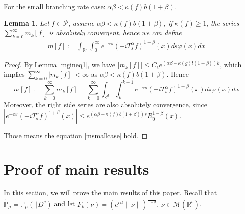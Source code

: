 \documentclass[12pt,oneside,english]{amsart}
\theoremstyle{plain}
\newtheorem{lem}[thm]{Lemma}
\theoremstyle{definition}
\numberwithin{equation}{section}
\begin{document}
For the small branching rate case: $\alpha\beta<\kappa(f)b(1+\beta)$.
\begin{lem}\label{lemma211}
Let $f\in \mathcal{P}$, assume $\alpha\beta<\kappa(f)b(1+\beta)$, if $\kappa(f)\geq 1$, the series $\sum_{k=0}^{\infty}m_k[f]$ is absolutely convergent, hence we can define
\begin{align}
    m[f]:=\int_{\mathbb{R}^d}\int_0^{\infty} e^{-\alpha s}(-iT_{s}^{\alpha}f)^{1+\beta}(x)ds\varphi(x)dx \label{msmallcase}
\end{align}
\end{lem}
\begin{proof}
    By Lemma \ref{mgineq1}, we have $|m_k[f]|\leq C_6 e^{(\alpha\beta-\kappa(g)b(1+\beta))k}$, which implies $\sum_{k=0}^{\infty}|m_k[f]|<\infty$ as $\alpha\beta<\kappa(f)b(1+\beta)$. Hence
    $$m[f]:=\sum_{k=0}^{\infty}m_k[f]=\sum_{k=0}^{\infty}\int_{\mathbb{R}^d}\int_k^{k+1} e^{-\alpha s}(-iT_{s}^{\alpha}f)^{1+\beta}(x)ds\varphi(x)dx$$
     Moreover, the right side series are also absolutely convergence, since $|e^{-\alpha s}(-iT_{s}^{\alpha}f)^{1+\beta}(x)|\leq e^{(\alpha\beta-\kappa(f)b(1+\beta))s}R_0^{1+\beta}(x)$.

     Those means the equation \eqref{msmallcase} hold.
\end{proof}

\section{Proof of main results}

In this section, we will prove the main results of this paper. Recall that $\mathbb{\tilde{P}}_{\mu}=\mathbb{P}_{\mu}(\cdot|D^c)$ and let $F_k(\nu)=\left(e^{\alpha k}\|\nu\|\right)^{\frac{1}{1+\beta}},~ \nu\in \mathcal{M}(\mathbb{R}^d)$.
\end{document}

